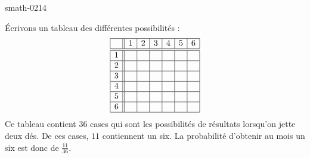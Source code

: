 
\begin{corrige}{smath-0214}

    Écrivons un tableau des différentes possibilités :
    \begin{equation*}
        \begin{array}[]{|c||c|c|c|c|c|c|}
            \hline
            &1&2&3&4&5&6\\
            \hline\hline
            1&&&&&&\\
            \hline
            2&&&&&&\\
            \hline
            3&&&&&&\\
            \hline
            4&&&&&&\\
            \hline
            5&&&&&&\\
            \hline
            6&&&&&&\\
            \hline
        \end{array}
    \end{equation*}
    Ce tableau contient \( 36\) cases qui sont les possibilités de résultats lorsqu'on jette deux dés. De ces cases, \( 11\) contiennent un six. La probabilité d'obtenir au mois un six est donc de \( \frac{ 11 }{ 36 }\).

\end{corrige}
